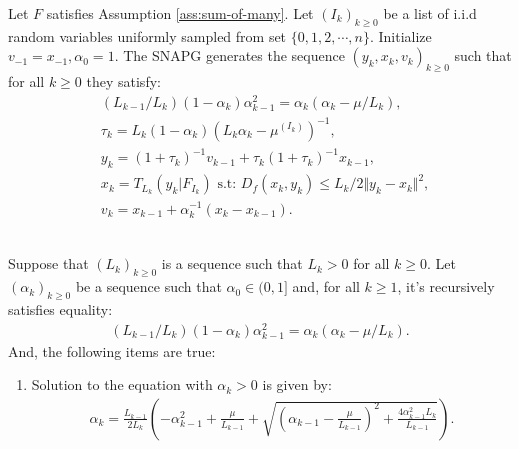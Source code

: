 \documentclass[12pt]{article}
\begin{document}
        \begin{definition}[SNAPG-V2]\label{def:snapg-v2}
            Let $F$ satisfies Assumption \ref{ass:sum-of-many}. 
            Let $(I_k)_{k \ge 0}$ be a list of i.i.d random variables uniformly sampled from set $\{0, 1, 2, \cdots, n\}$. 
            Initialize $v_{-1} = x_{-1}, \alpha_0 = 1$. 
            The SNAPG generates the sequence $(y_k, x_k, v_k)_{k \ge 0}$ such that for all $k \ge 0$ they satisfy: 
            \begin{align*}
                & (L_{k - 1}/L_k)(1 - \alpha_{k})\alpha_{k - 1}^2 = \alpha_{k}\left(\alpha_{k} - \mu/L_k\right), \\
                & \tau_k = L_k(1 - \alpha_k)\left(L_k \alpha_k - \mu^{(I_k)}\right)^{-1}, \\
                & y_k = (1 + \tau_k)^{-1}v_{k - 1} + \tau_k(1 + \tau_k)^{-1}x_{k - 1}, \\
                & x_k =  T_{L_k}(y_k | F_{I_k}) \text{ s.t: } D_f(x_k, y_k) \le L_k/2\Vert y_k - x_k\Vert^2, \\
                & v_k = x_{k - 1} + \alpha_k^{-1}(x_k - x_{k - 1}). 
            \end{align*}
        \end{definition}

        \begin{lemma}\;\label{lemma:snapg-v2-seq-range}\\
            Suppose that $(L_k)_{k \ge 0}$ is a sequence such that $L_k > 0$ for all $k \ge 0$. 
            Let $(\alpha_k)_{k \ge 0}$ be a sequence such that $\alpha_0 \in (0, 1]$ and, for all $k \ge 1$, it's recursively satisfies equality: 
            \begin{align*}
                (L_{k - 1}/L_k)(1 - \alpha_{k})\alpha_{k - 1}^2 = \alpha_{k}\left(\alpha_{k} - \mu/L_k\right). 
            \end{align*}
            And, the following items are true: 
            \begin{enumerate}
                \item Solution to the equation with $\alpha_k > 0$ is given by: 
                \begin{align*}
                    \alpha_k = \frac{L_{k - 1}}{2L_k} \left(
                        - \alpha_{k - 1}^2 + \frac{\mu}{L_{k - 1}}
                        + \sqrt{
                            \left(
                                \alpha_{k - 1} - \frac{\mu}{L_{k - 1}}
                            \right)^2
                            + \frac{4\alpha_{k - 1}^2L_k}{L_{k - 1}}
                        }
                    \right). 
                \end{align*}
            \end{enumerate}
        \end{lemma}
\end{document}
